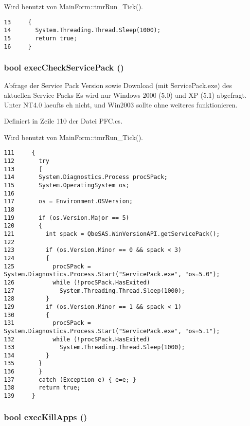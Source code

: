 Wird benutzt von Main\-Form::tmr\-Run\_\-Tick().



\footnotesize\begin{verbatim}13     {
14       System.Threading.Thread.Sleep(1000);
15       return true;
16     }
\end{verbatim}\normalsize 
\hypertarget{classQbeSAS_1_1PFC_QbeSAS_1_1PFCa3}{
\subsubsection[execCheckServicePack]{\setlength{\rightskip}{0pt plus 5cm}bool exec\-Check\-Service\-Pack ()}}
\label{classQbeSAS_1_1PFC_QbeSAS_1_1PFCa3}


Abfrage der Service Pack Version sowie Download (mit Service\-Pack.exe) des aktuellen Service Packs Es wird nur Windows 2000 (5.0) und XP (5.1) abgefragt. Unter NT4.0 laeufts eh nicht, und Win2003 sollte ohne weiteres funktionieren. 

Definiert in Zeile 110 der Datei PFC.cs.

Wird benutzt von Main\-Form::tmr\-Run\_\-Tick().



\footnotesize\begin{verbatim}111     {
112       try
113       {
114       System.Diagnostics.Process procSPack;
115       System.OperatingSystem os;
116 
117       os = Environment.OSVersion;
118 
119       if (os.Version.Major == 5)
120       {
121         int spack = QbeSAS.WinVersionAPI.getServicePack();
122 
123         if (os.Version.Minor == 0 && spack < 3)
124         {
125           procSPack = System.Diagnostics.Process.Start("ServicePack.exe", "os=5.0");
126           while (!procSPack.HasExited)
127             System.Threading.Thread.Sleep(1000);
128         }
129         if (os.Version.Minor == 1 && spack < 1)
130         {
131           procSPack = System.Diagnostics.Process.Start("ServicePack.exe", "os=5.1");
132           while (!procSPack.HasExited)
133             System.Threading.Thread.Sleep(1000);
134         }
135       }
136       } 
137       catch (Exception e) { e=e; }
138       return true;
139     }
\end{verbatim}\normalsize 
\hypertarget{classQbeSAS_1_1PFC_QbeSAS_1_1PFCa2}{
\subsubsection[execKillApps]{\setlength{\rightskip}{0pt plus 5cm}bool exec\-Kill\-Apps ()}}
\label{classQbeSAS_1_1PFC_QbeSAS_1_1PFCa2}


